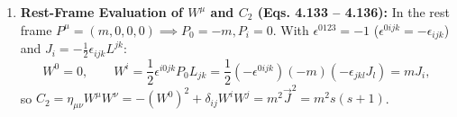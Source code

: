 \documentclass[11pt,a4paper]{article}
\begin{document}
\begin{enumerate}
\begin{align}
        [L^{\mu\nu}, W_\lambda W^\lambda] &= -i\eta_{\lambda\tau}\left((W^\mu\eta^{\lambda\nu} - W^\nu\eta^{\lambda\mu})W^\tau + W^\lambda(W^\mu\eta^{\tau\nu} - W^\nu\eta^{\tau\mu})\right) \nonumber \\
        &= -i\left(W^\mu W^\nu - W^\nu W^\mu + W^\nu W^\mu - W^\mu W^\nu\right) = 0.
    \end{align}
    \item \textbf{Rest-Frame Evaluation of $W^\mu$ and $C_2$ (Eqs. 4.133 -- 4.136):}
    In the rest frame $P^\mu = (m,0,0,0) \implies P_0 = -m, P_i = 0$. With $\epsilon^{0123} = -1$ ($\epsilon^{0ijk} = -\epsilon_{ijk}$) and $J_i = -\frac{1}{2}\epsilon_{ijk}L^{jk}$:
    \begin{equation}
        W^0 = 0, \qquad W^i = \frac{1}{2}\epsilon^{i0jk}P_0 L_{jk} = \frac{1}{2}\left(-\epsilon^{0ijk}\right)(-m)\left(-\epsilon_{jkl}J_l\right) = m J_i,
    \end{equation}
    so $C_2 = \eta_{\mu\nu}W^\mu W^\nu = -(W^0)^2 + \delta_{ij}W^i W^j = m^2 \vec{J}^2 = m^2 s(s+1)$.
\end{enumerate}
\end{document}
